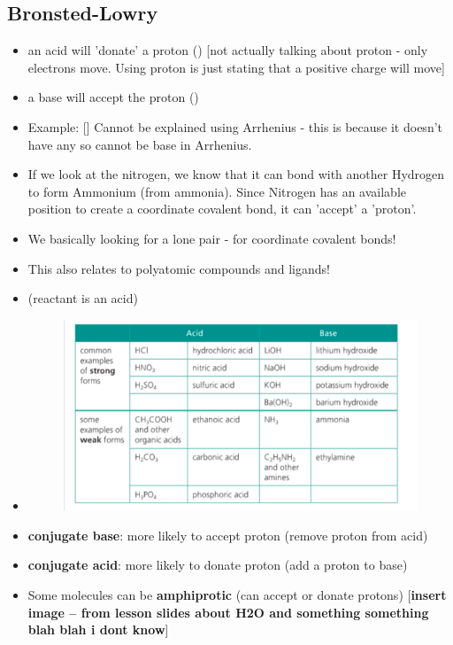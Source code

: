 \documentclass{article}
\begin{document}
\subsection{Bronsted-Lowry}
\begin{itemize}
\item an acid will 'donate' a proton () [not actually talking about proton - only electrons move. Using proton is just stating that a positive charge will move] \item a base will accept the proton () \item Example: [] Cannot be explained using Arrhenius - this is because it doesn't have any  so cannot be base in Arrhenius. \item If we look at the nitrogen, we know that it can bond with another Hydrogen to form Ammonium (from ammonia). Since Nitrogen has an available position to create a coordinate covalent bond,  it can 'accept' a 'proton'.  \item We basically looking for a lone pair - for coordinate covalent bonds! \item This also relates to polyatomic compounds and ligands! \item {} (reactant is an acid) \item {} \begin{figure}[H]\includegraphics[width=\textwidth]{3.1fig1.png}\end{figure}
\item \textbf{conjugate base}: more likely to accept proton (remove proton from acid)  \item \textbf{conjugate acid}: more likely to donate proton (add a proton to base) \item Some molecules can be \textbf{amphiprotic} (can accept or donate protons) [\textbf{insert image -- from lesson slides about H2O and something something blah blah i dont know}]
\end{itemize}
\end{document}
